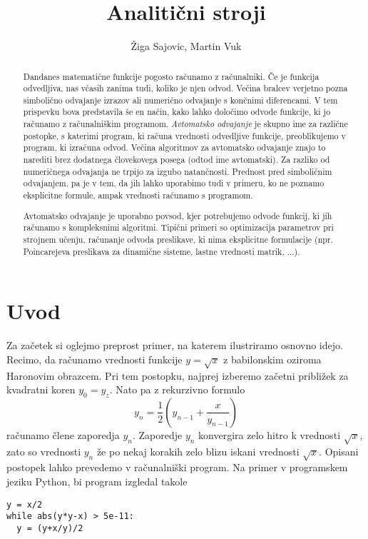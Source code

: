 \documentclass{article}
\title{Analitični stroji}
\author{Žiga Sajovic, Martin Vuk}
\begin{document}
\maketitle
\begin{abstract}
  Dandanes matematične funkcije pogosto računamo z računalniki. Če je funkcija
  odvedljiva, nas včasih zanima tudi, koliko je njen odvod. Večina bralcev verjetno
  pozna simbolično odvajanje izrazov ali numerično odvajanje s končnimi
  diferencami. V tem prispevku bova predstavila še en način, kako lahko določimo
  odvode funkcije, ki jo računamo z računalniškim programom. \emph{Avtomatsko
    odvajanje} je skupno ime za različne postopke, s katerimi program, ki računa
  vrednosti odvedljive funkcije, preoblikujemo v program, ki izračuna odvod. 
  Večina algoritmov za avtomatsko odvajanje znajo to narediti brez dodatnega
  človekovega posega (odtod ime avtomatski). Za razliko
  od numeričnega odvajanja ne trpijo za izgubo natančnosti. Prednost pred
  simboličnim odvajanjem, pa je v tem, da jih lahko uporabimo tudi v primeru, ko
  ne poznamo eksplicitne formule, ampak vrednosti računamo s programom.

  Avtomatsko odvajanje je uporabno povsod, kjer potrebujemo 
  odvode funkcij, ki jih računamo s kompleksnimi algoritmi. Tipični primeri so
  optimizacija parametrov pri strojnem učenju, računanje odvoda preslikave, ki nima
  eksplicitne formulacije (npr. Poincarejeva preslikava za dinamične sisteme,
  lastne vrednosti matrik, ...).
\end{abstract}
\section{Uvod}
Za začetek si oglejmo preprost primer, na katerem ilustriramo osnovno idejo.
Recimo, da računamo vrednosti funkcije $y=\sqrt{x}$ z babilonskim oziroma Haronovim obrazcem.
Pri tem postopku, najprej izberemo začetni približek za
kvadratni koren $y_0=y_z$. Nato pa z rekurzivno formulo
\begin{equation*}
  y_n=\frac{1}{2}\left( y_{n-1}+\frac{x}{y_{n-1}} \right)
\end{equation*}
računamo člene zaporedja $y_n$. Zaporedje $y_n$ konvergira zelo hitro k
vrednosti $\sqrt{x}$, zato so vrednosti $y_n$ že po nekaj korakih zelo blizu
iskani vrednosti $\sqrt{x}$. Opisani postopek lahko prevedemo v računalniški
program. Na primer v programskem jeziku Python, bi program izgledal takole 

\begin{verbatim}
y = x/2
while abs(y*y-x) > 5e-11:
  y = (y+x/y)/2
\end{verbatim}
\end{document}
